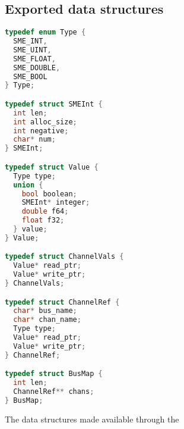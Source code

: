 \subsection{Exported data structures}
\begin{lstlisting}[language=c,multicols=2]
typedef enum Type {
  SME_INT,
  SME_UINT,
  SME_FLOAT,
  SME_DOUBLE,
  SME_BOOL
} Type;

typedef struct SMEInt {
  int len;
  int alloc_size;
  int negative;
  char* num;
} SMEInt;

typedef struct Value {
  Type type;
  union {
    bool boolean;
    SMEInt* integer;
    double f64;
    float f32;
  } value;
} Value;

typedef struct ChannelVals {
  Value* read_ptr;
  Value* write_ptr;
} ChannelVals;

typedef struct ChannelRef {
  char* bus_name;
  char* chan_name;
  Type type;
  Value* read_ptr;
  Value* write_ptr;
} ChannelRef;

typedef struct BusMap {
  int len;
  ChannelRef** chans;
} BusMap;
\end{lstlisting}

The data structures made available through the 

